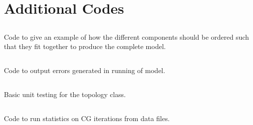 \chapter{Additional Codes} %

\label{Chapter9} %

\section{}
Code to give an example of how the different components should be ordered such that they fit together to produce the complete model. 

\section{}
Code to output errors generated in running of model.

\section{}
Basic unit testing for the topology class.

\section{}
Code to run statistics on CG iterations from data files.
